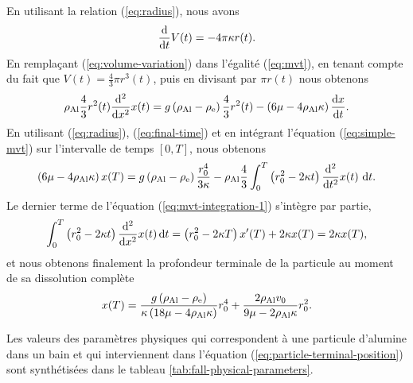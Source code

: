 En utilisant la relation (\ref{eq:radius}), nous avons
\begin{equation}\label{eq:volume-variation}
  \frac{\mathrm d}{\mathrm dt}V(t) = -4\pi \kappa r(t).
\end{equation}
En remplaçant (\ref{eq:volume-variation}) dans l'égalité
(\ref{eq:mvt}), en tenant compte du fait que $V(t) = \frac{4}{3}\pi
r^3(t)$, puis en divisant par $\pi r(t)$ nous obtenons
\begin{equation}\label{eq:simple-mvt}
\rho_\mathrm{Al} \frac{4}{3}r^2(t)\frac{\mathrm d^2}{\mathrm dx^2}x(t)
= g\left( \rho_\mathrm{Al} - \rho_\mathrm{e} \right)\frac{4}{3}r^2(t) -
\left( 6\mu - 4\rho_\mathrm{Al}
  \kappa \right)\frac{\mathrm dx}{\mathrm dt}.
\end{equation}
En utilisant (\ref{eq:radius}), (\ref{eq:final-time}) et en
intégrant l'équation (\ref{eq:simple-mvt}) sur l'intervalle de temps $[0, T]$, nous
obtenons
\begin{equation}\label{eq:mvt-integration-1}
\left( 6\mu - 4\rho_\mathrm{Al}\kappa \right)x(T)
= g\left( \rho_\mathrm{Al} -
  \rho_\mathrm{e} \right)\frac{r_0^4}{3\kappa}-\rho_\mathrm{Al}\frac{4}{3}\int_0^T\left( r_0^2
- 2\kappa t \right)\frac{\mathrm d^2}{\mathrm dt^2}x(t)\,\,\mathrm dt.
\end{equation}
Le dernier terme de l'équation (\ref{eq:mvt-integration-1}) s'intègre
par partie,
\begin{equation}
\int_0^T\left( r_0^2 - 2\kappa t \right)\frac{\mathrm d^2}{\mathrm
dx^2}x(t)\,\mathrm dt = \left( r_0^2 - 2\kappa T \right)x'(T) +
2\kappa x(T) = 2\kappa x(T),
\end{equation}
et nous obtenons finalement la profondeur terminale de la particule au
moment de sa dissolution complète
\begin{equation}\label{eq:particle-terminal-position}
x(T) = \frac{g\left( \rho_\mathrm{Al} - \rho_\mathrm{e}
     \right)}{\kappa
  \left( 18\mu - 4\rho_\mathrm{Al}
    \kappa \right)}r_0^4 + \frac{2 \rho_\mathrm{Al}
  v_0}{9\mu - 2\rho_\mathrm{Al} \kappa} r_0^2.
\end{equation}

Les valeurs des paramètres physiques qui correspondent à une particule
d'alumine dans un bain et qui interviennent dans l'équation
(\ref{eq:particle-terminal-position}) sont synthétisées dans le
tableau \ref{tab:fall-physical-parameters}.

